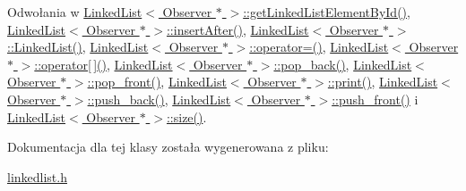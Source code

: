 Odwołania w \hyperlink{linkedlist_8h_source_l00197}{Linked\-List$<$ Observer $\ast$ $>$\-::get\-Linked\-List\-Element\-By\-Id()}, \hyperlink{linkedlist_8h_source_l00238}{Linked\-List$<$ Observer $\ast$ $>$\-::insert\-After()}, \hyperlink{linkedlist_8h_source_l00038}{Linked\-List$<$ Observer $\ast$ $>$\-::\-Linked\-List()}, \hyperlink{linkedlist_8h_source_l00262}{Linked\-List$<$ Observer $\ast$ $>$\-::operator=()}, \hyperlink{linkedlist_8h_source_l00159}{Linked\-List$<$ Observer $\ast$ $>$\-::operator\mbox{[}$\,$\mbox{]}()}, \hyperlink{linkedlist_8h_source_l00073}{Linked\-List$<$ Observer $\ast$ $>$\-::pop\-\_\-back()}, \hyperlink{linkedlist_8h_source_l00087}{Linked\-List$<$ Observer $\ast$ $>$\-::pop\-\_\-front()}, \hyperlink{linkedlist_8h_source_l00144}{Linked\-List$<$ Observer $\ast$ $>$\-::print()}, \hyperlink{linkedlist_8h_source_l00100}{Linked\-List$<$ Observer $\ast$ $>$\-::push\-\_\-back()}, \hyperlink{linkedlist_8h_source_l00113}{Linked\-List$<$ Observer $\ast$ $>$\-::push\-\_\-front()} i \hyperlink{linkedlist_8h_source_l00065}{Linked\-List$<$ Observer $\ast$ $>$\-::size()}.



Dokumentacja dla tej klasy została wygenerowana z pliku\-:\begin{DoxyCompactItemize}
\item 
\hyperlink{linkedlist_8h}{linkedlist.\-h}\end{DoxyCompactItemize}
